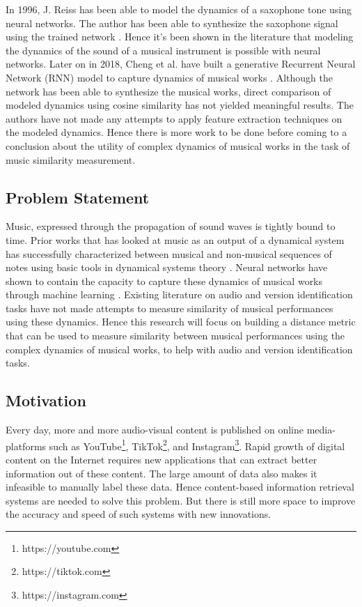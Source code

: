 \documentclass[../main.tex]{subfiles}
\begin{document}
\par
In 1996, J. Reiss has been able to model the dynamics of a saxophone tone using neural networks. The author has been able to synthesize the saxophone signal using the trained network \cite{robelNeuralNetworkModeling1997}. Hence it's been shown in the literature that modeling the dynamics of the sound of a musical instrument is possible with neural networks. Later on in 2018, Cheng et al. have built a generative Recurrent Neural Network (\gls{RNN}) model to capture dynamics of musical works  \cite{tian_cheng_comparing_2018}. Although the network has been able to synthesize the musical works, direct comparison of modeled dynamics using cosine similarity has not yielded meaningful results. The authors have not made any attempts to apply feature extraction techniques on the modeled dynamics. Hence there is more work to be done before coming to a conclusion about the utility of complex dynamics of musical works in the task of music similarity measurement.


\subsection{Problem Statement}

\par
Music, expressed through the propagation of sound waves is tightly bound to time. Prior works that has looked at music as an output of a dynamical system has successfully characterized between musical and non-musical sequences of notes using basic tools in dynamical systems theory \cite{complex_dynamics}. Neural networks have shown to contain the capacity to capture these dynamics of musical works through machine learning \cite{robelNeuralNetworkModeling1997,dynamic_process_modeling_with_rnn}. Existing literature on audio and version identification tasks have not made attempts to measure similarity of musical performances using these dynamics. Hence this research will focus on building a distance metric that can be used to measure similarity between musical performances using the complex dynamics of musical works, to help with audio and version identification tasks.



\subsection{Motivation}

\par
Every day, more and more audio-visual content is published on online media-platforms such as YouTube\footnote{https://youtube.com}, TikTok\footnote{https://tiktok.com}, and Instagram\footnote{https://instagram.com}. Rapid growth of digital content on the Internet requires new applications that can extract better information out of these content. The large amount of data also makes it infeasible to manually label these data. Hence content-based information retrieval systems are needed to solve this problem. But there is still more space to improve the accuracy and speed of such systems with new innovations.
\end{document}
